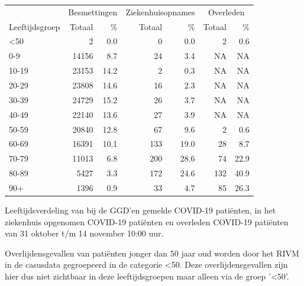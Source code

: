 \documentclass[
  english,
  man,floatsintext]{apa6}
\begin{document}
\begin{table}
\centering\begingroup\fontsize{11}{13}\selectfont

\begin{threeparttable}
\begin{tabular}{lrrrrrr}
\toprule
\multicolumn{1}{c}{ } & \multicolumn{2}{c}{Besmettingen} & \multicolumn{2}{c}{Ziekenhuisopnames} & \multicolumn{2}{c}{Overleden} \\
\cmidrule(l{3pt}r{3pt}){2-3} \cmidrule(l{3pt}r{3pt}){4-5} \cmidrule(l{3pt}r{3pt}){6-7}
Leeftijdsgroep & Totaal & \% & Totaal & \% & Totaal & \%\\
\midrule
<50 & 2 & 0.0 & 0 & 0.0 & 2 & 0.6\\
0-9 & 14156 & 8.7 & 24 & 3.4 & NA & NA\\
10-19 & 23153 & 14.2 & 2 & 0.3 & NA & NA\\
20-29 & 23808 & 14.6 & 16 & 2.3 & NA & NA\\
30-39 & 24729 & 15.2 & 26 & 3.7 & NA & NA\\
40-49 & 22140 & 13.6 & 27 & 3.9 & NA & NA\\
50-59 & 20840 & 12.8 & 67 & 9.6 & 2 & 0.6\\
60-69 & 16391 & 10.1 & 133 & 19.0 & 28 & 8.7\\
70-79 & 11013 & 6.8 & 200 & 28.6 & 74 & 22.9\\
80-89 & 5427 & 3.3 & 172 & 24.6 & 132 & 40.9\\
90+ & 1396 & 0.9 & 33 & 4.7 & 85 & 26.3\\
\bottomrule
\end{tabular}
\begin{tablenotes}
\item[1] Leeftijdsverdeling van bij de GGD’en gemelde COVID-19 patiënten, in het ziekenhuis opgenomen COVID-19 patiënten en overleden COVID-19 patiënten van 31 oktober t/m 14 november 10:00 uur.
\item[2] Overlijdensgevallen van patiënten jonger dan 50 jaar oud worden door het RIVM in de casusdata gegroepeerd in de categorie <50. Deze overlijdensgevallen zijn hier dus niet zichtbaar in deze leeftijdsgroepen maar alleen via de groep '<50'.
\end{tablenotes}
\end{threeparttable}
\endgroup{}
\end{table}

\newpage
\end{document}
